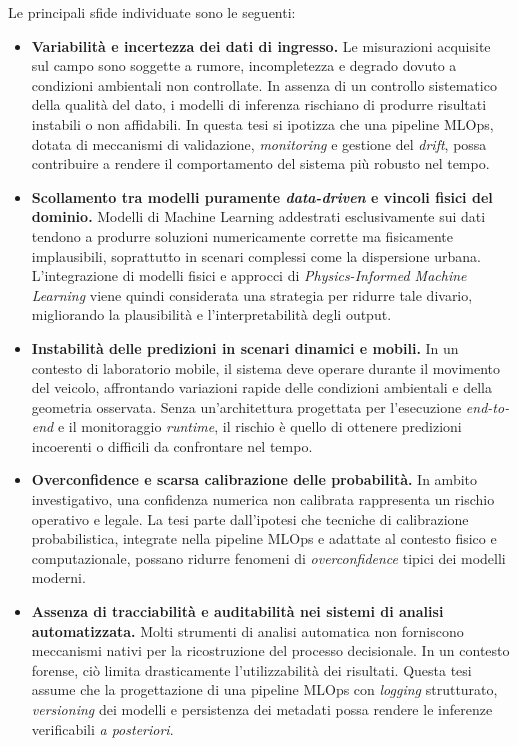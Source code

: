 Le principali sfide individuate sono le seguenti:

\begin{itemize}
    \item \textbf{Variabilità e incertezza dei dati di ingresso.}
    Le misurazioni acquisite sul campo sono soggette a rumore, incompletezza e degrado dovuto a condizioni ambientali non controllate.
    In assenza di un controllo sistematico della qualità del dato, i modelli di inferenza rischiano di produrre risultati instabili o non affidabili.
    In questa tesi si ipotizza che una pipeline MLOps, dotata di meccanismi di validazione, \textit{monitoring} e gestione del \textit{drift}, possa contribuire a rendere il comportamento del sistema più robusto nel tempo.

    \item \textbf{Scollamento tra modelli puramente \textit{data-driven} e vincoli fisici del dominio.}
    Modelli di Machine Learning addestrati esclusivamente sui dati tendono a produrre soluzioni numericamente corrette ma fisicamente implausibili, soprattutto in scenari complessi come la dispersione urbana.
    L’integrazione di modelli fisici e approcci di \emph{Physics-Informed Machine Learning} viene quindi considerata una strategia per ridurre tale divario, migliorando la plausibilità e l’interpretabilità degli output.

    \item \textbf{Instabilità delle predizioni in scenari dinamici e mobili.}
    In un contesto di laboratorio mobile, il sistema deve operare durante il movimento del veicolo, affrontando variazioni rapide delle condizioni ambientali e della geometria osservata.
    Senza un’architettura progettata per l’esecuzione \textit{end-to-end} e il monitoraggio \textit{runtime}, il rischio è quello di ottenere predizioni incoerenti o difficili da confrontare nel tempo.

    \item \textbf{Overconfidence e scarsa calibrazione delle probabilità.}
    In ambito investigativo, una confidenza numerica non calibrata rappresenta un rischio operativo e legale.
    La tesi parte dall’ipotesi che tecniche di calibrazione probabilistica, integrate nella pipeline MLOps e adattate al contesto fisico e computazionale, possano ridurre fenomeni di \textit{overconfidence} tipici dei modelli moderni.

    \item \textbf{Assenza di tracciabilità e auditabilità nei sistemi di analisi automatizzata.}
    Molti strumenti di analisi automatica non forniscono meccanismi nativi per la ricostruzione del processo decisionale.
    In un contesto forense, ciò limita drasticamente l’utilizzabilità dei risultati.
    Questa tesi assume che la progettazione di una pipeline MLOps con \textit{logging} strutturato, \textit{versioning} dei modelli e persistenza dei metadati possa rendere le inferenze verificabili \emph{a posteriori}.


\end{itemize}
